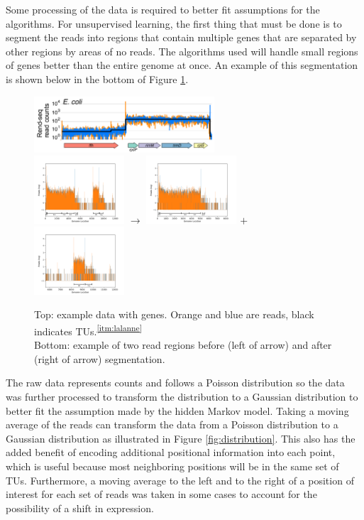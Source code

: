 \documentclass{article}
\newcommand{\cited}[1]{\textsuperscript{\ref{itm:#1}}}
\begin{document}
Some processing of the data is required to better fit assumptions for the algorithms.  For unsupervised learning, the first thing that must be done is to segment the reads into regions that contain multiple genes that are separated by other regions by areas of no reads.  The algorithms used will handle small regions of genes better than the entire genome at once.  An example of this segmentation is shown below in the bottom of Figure \ref{fig:reads}.

\begin{figure}[H]
    \centering
    \includegraphics[width=0.6\textwidth]{lalanne_reads.png} \\
    \includegraphics[align=c, width=0.3\textwidth]{both.png} $\boldsymbol{\longrightarrow}$
    \includegraphics[align=c, width=0.3\textwidth]{0.png} $\boldsymbol{+}$
    \includegraphics[align=c, width=0.3\textwidth]{1.png}
    \caption{Top: example data with genes. Orange and blue are reads, black indicates TUs.\cited{lalanne}\\ Bottom: example of two read regions before (left of arrow) and after (right of arrow) segmentation.}
    \label{fig:reads}
\end{figure}

The raw data represents counts and follows a Poisson distribution so the data was further processed to transform the distribution to a Gaussian distribution to better fit the assumption made by the hidden Markov model.  Taking a moving average of the reads can transform the data from a Poisson distribution to a Gaussian distribution as illustrated in Figure \ref{fig:distribution}.  This also has the added benefit of encoding additional positional information into each point, which is useful because most neighboring positions will be in the same set of TUs.  Furthermore, a moving average to the left and to the right of a position of interest for each set of reads was taken in some cases to account for the possibility of a shift in expression.
\end{document}
